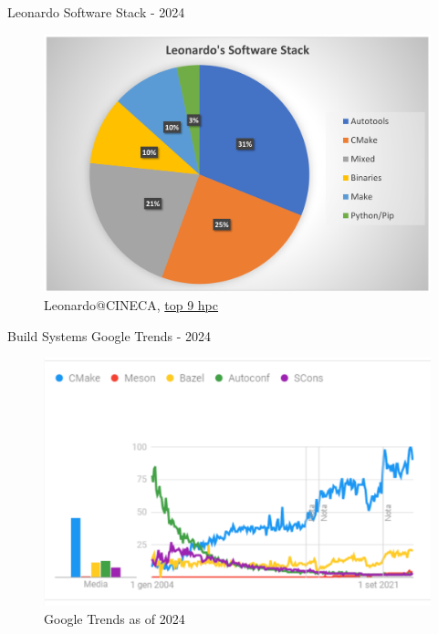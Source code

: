 \documentclass[aspectratio=169,11pt]{beamer}
\begin{document}
\begin{frame}{Leonardo Software Stack - 2024}
\begin{figure}
	\centering
	\includegraphics[width=0.7\linewidth]{img/cineca}
	\caption{Leonardo@CINECA, \href{https://www.top500.org/lists/top500/2024/11/}{\color{blue} top 9 hpc}}
\end{figure}
\end{frame}

\begin{frame}{Build Systems Google Trends - 2024}
	\begin{figure}
		\centering
		\includegraphics[width=0.7\linewidth]{img/google}
		\caption{Google Trends as of 2024}
	\end{figure}
\end{frame}
\end{document}
